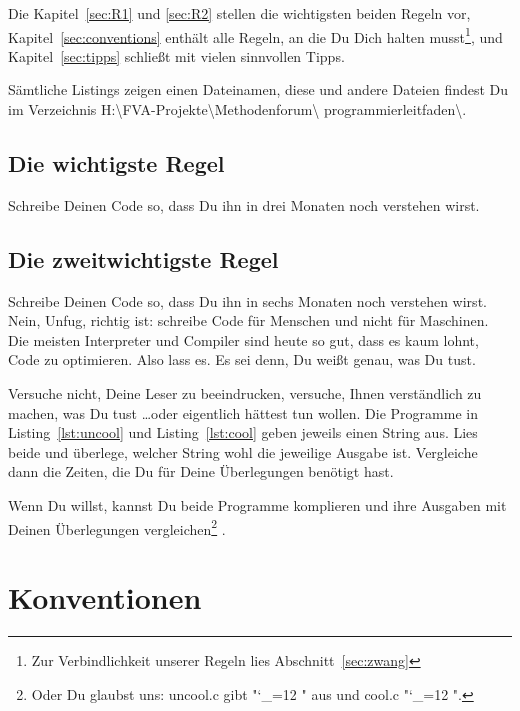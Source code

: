 \documentclass[twoside]{scrartcl}
\providecommand{\proot}{%
H:\textbackslash{}FVA-Projekte\textbackslash{}Methodenforum\textbackslash{}%
}
\providecommand{\pdir}{\proot{}programmierleitfaden\textbackslash{}}
\begin{document}
Die Kapitel~\ref{sec:R1} und \ref{sec:R2} stellen die wichtigsten beiden Regeln
vor, Kapitel~\ref{sec:conventions} enth\"a{}lt alle Regeln, an die Du Dich
halten musst\footnote{
  Zur Verbindlichkeit unserer Regeln lies Abschnitt~\ref{sec:zwang}
}, und Kapitel~\ref{sec:tipps} schlie\ss{}t mit vielen sinnvollen Tipps.

S\"a{}mtliche Listings zeigen einen Dateinamen, diese und andere  Dateien 
findest Du im Verzeichnis  
\pdir.


\subsection{Die wichtigste Regel\label{sec:R1}}
Schreibe Deinen Code so, dass Du ihn in drei Monaten noch verstehen wirst.

\subsection{Die zweitwichtigste Regel\label{sec:R2}}
Schreibe Deinen Code so, dass Du ihn in sechs Monaten noch verstehen wirst. 
Nein, Unfug, richtig ist: schreibe Code f\"u{}r Menschen und nicht f\"u{}r 
Maschinen. Die meisten Interpreter und Compiler sind heute so gut, dass es
kaum lohnt, Code zu optimieren. Also lass es. Es sei denn, Du wei\ss{}t
genau, was Du tust. 

Versuche nicht, Deine Leser zu beeindrucken, versuche, Ihnen verst\"a{}ndlich zu
machen, was Du tust \ldots oder eigentlich h\"a{}ttest tun wollen.
Die Programme in  Listing~\ref{lst:uncool} und Listing~\ref{lst:cool} geben
jeweils einen String aus. Lies beide und
\"u{}berlege, welcher String wohl die jeweilige Ausgabe ist. Vergleiche dann die
Zeiten, die Du f\"u{}r Deine \"U{}berlegungen ben\"o{}tigt 
hast. 




Wenn Du willst, kannst Du  beide Programme komplieren und ihre Ausgaben mit
Deinen \"U{}berlegungen vergleichen\footnote{%
%
Oder Du glaubst uns: uncool.c gibt 
"\catcode`_=12 \ttfamily "
aus und cool.c 
"\catcode`_=12 \ttfamily ".
}%
. 

\section{Konventionen\label{sec:conventions}}
\end{document}
